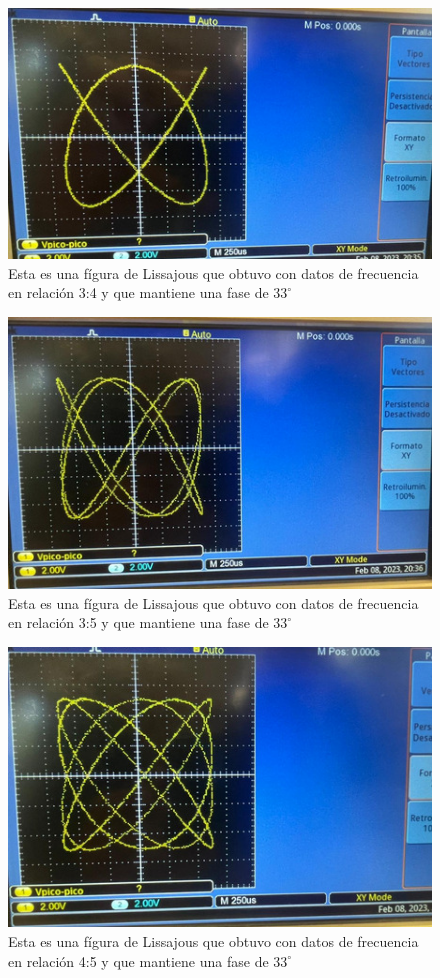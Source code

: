 \documentclass[a4paper, amsfonts, amssymb, amsmath, reprint, showkeys, nofootinbib, twoside]{revtex4-1}
\begin{document}
\begin{figure}[H]
    \centering
    \includegraphics[scale=0.4]{Exp2_Img4.jpeg}
    \caption{Esta es una fígura de Lissajous que obtuvo con datos de frecuencia en relación 3:4 y que mantiene una fase de $33^\circ$}
    \label{fig:3_4}
\end{figure}
\begin{figure}[H]
    \centering
    \includegraphics[scale=0.4]{Exp2_Img5.jpeg}
    \caption{Esta es una fígura de Lissajous que obtuvo con datos de frecuencia en relación 3:5 y que mantiene una fase de $33^\circ$}
    \label{fig:3_5}
\end{figure}
\begin{figure}[H]
    \centering
    \includegraphics[scale=0.4]{Exp2_Img6.jpeg}
    \caption{Esta es una fígura de Lissajous que obtuvo con datos de frecuencia en relación 4:5 y que mantiene una fase de $33^\circ$}
    \label{fig:4_5}
\end{figure}
\end{document}

